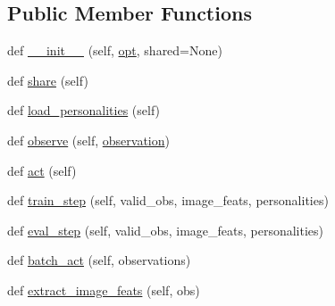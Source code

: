 \subsection*{Public Member Functions}
\begin{DoxyCompactItemize}
\item 
def \hyperlink{classprojects_1_1personality__captions_1_1transresnet_1_1transresnet_1_1TransresnetAgent_a0ef5e4216cb586b31414df5c0992269d}{\+\_\+\+\_\+init\+\_\+\+\_\+} (self, \hyperlink{classprojects_1_1personality__captions_1_1transresnet_1_1transresnet_1_1TransresnetAgent_a4a66af4ad244944bef1de1010d4f2c1e}{opt}, shared=None)
\item 
def \hyperlink{classprojects_1_1personality__captions_1_1transresnet_1_1transresnet_1_1TransresnetAgent_a3d5bcfdf1b547e56c6e6e1af047fa7c2}{share} (self)
\item 
def \hyperlink{classprojects_1_1personality__captions_1_1transresnet_1_1transresnet_1_1TransresnetAgent_a7e7fa664b89790467ceef3a41cfb623e}{load\+\_\+personalities} (self)
\item 
def \hyperlink{classprojects_1_1personality__captions_1_1transresnet_1_1transresnet_1_1TransresnetAgent_af78a4624bcebdd216c6cb9325cf59a81}{observe} (self, \hyperlink{classprojects_1_1personality__captions_1_1transresnet_1_1transresnet_1_1TransresnetAgent_adc97f37e227519a48abbfaab4bdd7e92}{observation})
\item 
def \hyperlink{classprojects_1_1personality__captions_1_1transresnet_1_1transresnet_1_1TransresnetAgent_abba9eae98eb8f0bac353e2da64b98044}{act} (self)
\item 
def \hyperlink{classprojects_1_1personality__captions_1_1transresnet_1_1transresnet_1_1TransresnetAgent_a5953c4f5ae44faf51f47e61194ada84e}{train\+\_\+step} (self, valid\+\_\+obs, image\+\_\+feats, personalities)
\item 
def \hyperlink{classprojects_1_1personality__captions_1_1transresnet_1_1transresnet_1_1TransresnetAgent_a407247b202808f7cc820819e6192c448}{eval\+\_\+step} (self, valid\+\_\+obs, image\+\_\+feats, personalities)
\item 
def \hyperlink{classprojects_1_1personality__captions_1_1transresnet_1_1transresnet_1_1TransresnetAgent_ac87e6396d4b4e3d6d8c69202940a2b11}{batch\+\_\+act} (self, observations)
\item 
def \hyperlink{classprojects_1_1personality__captions_1_1transresnet_1_1transresnet_1_1TransresnetAgent_acd07a9e73c6f58600c0db97331ff26f4}{extract\+\_\+image\+\_\+feats} (self, obs)
\item 

\end{DoxyCompactItemize}
